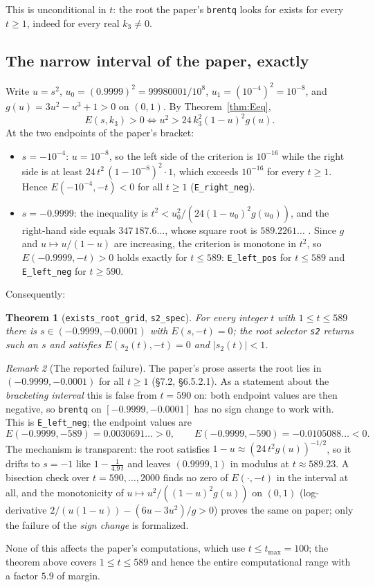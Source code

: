 \documentclass[11pt,a4paper]{article}
\newcommand{\lb}{\_\allowbreak}
\newcommand{\code}[1]{\texttt{#1}}
\newcommand{\itemization}[1]{\begin{itemize}[leftmargin=1.4em,itemsep=1pt,topsep=2pt]#1\end{itemize}}
\newtheorem{theorem}{Theorem}[section]
\theoremstyle{definition}
\theoremstyle{remark}
\newtheorem{remark}[theorem]{Remark}
\begin{document}
This is unconditional in $t$: the root the paper's \code{brentq} looks for exists for every
$t\ge1$, indeed for every real $k_3\neq0$.

\subsection{The narrow interval of the paper, exactly}

Write $u=s^2$, $u_0=(0.9999)^2=99980001/10^8$, $u_1=(10^{-4})^2=10^{-8}$, and
$g(u)=3u^2-u^3+1>0$ on $(0,1)$.  By Theorem~\ref{thm:Eeq},
\[
  E(s,k_3)>0 \iff u^2>24\,k_3^2(1-u)^2 g(u).
\]
At the two endpoints of the paper's bracket:
\itemization{
\item $s=-10^{-4}$: $u=10^{-8}$, so the left side of the criterion is $10^{-16}$ while the
  right side is at least $24\,t^2\,(1-10^{-8})^2\cdot 1$, which exceeds $10^{-16}$ for every
  $t\ge1$.  Hence $E(-10^{-4},-t)<0$ for all $t\ge1$ (\code{E\lb right\lb neg}).
\item $s=-0.9999$: the inequality is $t^2 < u_0^2/(24(1-u_0)^2g(u_0))$, and the right-hand
  side equals $347\,187.6\ldots$, whose square root is $589.2261\ldots$ .  Since $g$ and
  $u\mapsto u/(1-u)$ are increasing, the criterion is monotone in $t^2$, so
  $E(-0.9999,-t)>0$ holds exactly for $t\le589$: \code{E\lb left\lb pos} for $t\le589$
  and \code{E\lb left\lb neg} for $t\ge590$.
}
Consequently:

\begin{theorem}[\code{exists\lb root\lb grid}, \code{s2\lb spec}]
For every integer $t$ with $1\le t\le589$ there is $s\in(-0.9999,-0.0001)$ with
$E(s,-t)=0$; the root selector \code{s2} returns such an $s$ and satisfies
$E(s_2(t),-t)=0$ and $|s_2(t)|<1$.
\end{theorem}

\begin{remark}[The reported failure]\label{rem:failure}
The paper's prose asserts the root lies in $(-0.9999,-0.0001)$ for all $t\ge1$
(\S7.2, \S6.5.2.1).  As a statement about the \emph{bracketing interval} this is false from
$t=590$ on: both endpoint values are then negative, so \code{brentq} on
$[-0.9999,-0.0001]$ has no sign change to work with.  This is
\code{E\lb left\lb neg}; the endpoint values are
\[
  E(-0.9999,-589)=0.0030691\ldots>0,\qquad E(-0.9999,-590)=-0.0105088\ldots<0 .
\]
The mechanism is transparent: the root satisfies $1-u\approx(24\,t^2g(u))^{-1/2}$, so it
drifts to $s=-1$ like $1-\frac{1}{4.9\,t}$ and leaves $(0.9999,1)$ in modulus at
$t\approx589.23$.  A bisection check over $t=590,\dots,2000$ finds no zero of
$E(\cdot,-t)$ in the interval at all, and the monotonicity of $u\mapsto u^2/((1-u)^2g(u))$
on $(0,1)$ (log-derivative $2/(u(1-u))-(6u-3u^2)/g>0$) proves the same on paper; only the
failure of the \emph{sign change} is formalized.

None of this affects the paper's computations, which use $t\le t_{\max}=100$; the theorem
above covers $1\le t\le589$ and hence the entire computational range with a factor $5.9$ of
margin.
\end{remark}
\end{document}
